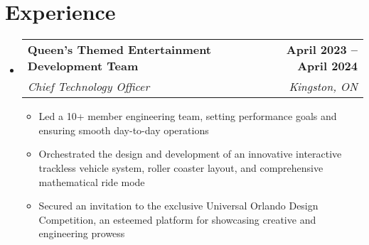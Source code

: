 \documentclass[letterpaper,11pt]{article}
\makeatletter
\newcommand{\resumeItem}[1]{
  \item\small{
    {#1 \vspace{-2pt}}
  }
}
\newcommand{\resumeSubheading}[4]{
  \vspace{-2pt}\item
    \begin{tabular*}{1.0\textwidth}[t]{l@{\extracolsep{\fill}}r}
      \textbf{#1} & \textbf{\small #2} \\
      \textit{\small#3} & \textit{\small #4} \\
    \end{tabular*}\vspace{-7pt}
}
\newcommand{\resumeSubHeadingListStart}{\begin{itemize}[leftmargin=0.0in, label={}]}
\newcommand{\resumeSubHeadingListEnd}{\end{itemize}}
\newcommand{\resumeItemListStart}{\begin{itemize}}
\newcommand{\resumeItemListEnd}{\end{itemize}\vspace{-5pt}}
\makeatother
\begin{document}
\section{Experience}
  \resumeSubHeadingListStart

    \resumeSubheading
      {Queen's Themed Entertainment Development Team}{April 2023 -- April 2024}
      {Chief Technology Officer}{Kingston, ON}
      \resumeItemListStart
        \resumeItem{Led a 10+ member engineering team, setting performance goals and ensuring smooth day-to-day operations}
        \resumeItem{Orchestrated the design and development of an innovative interactive trackless vehicle system, roller coaster layout, and comprehensive mathematical ride mode}
        \resumeItem{Secured an invitation to the exclusive Universal Orlando Design Competition, an esteemed platform for showcasing creative and engineering prowess}
      \resumeItemListEnd
    
  \resumeSubHeadingListEnd
\vspace{-16pt}

\end{document}
